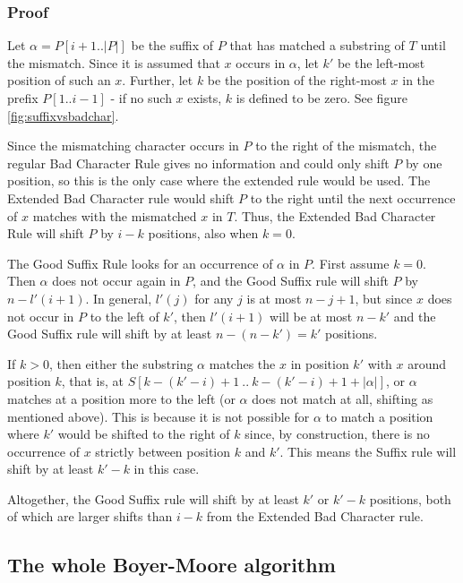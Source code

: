 \subsubsection{Proof}

Let $\alpha=P[i+1..|P|]$ be the suffix of $P$ that has matched a substring of $T$ until the mismatch. Since it is assumed that $x$ occurs in $\alpha$, let $k'$ be the left-most position of such an $x$. Further, let $k$ be the position of the right-most $x$ in the prefix $P[1..i-1]$ - if no such $x$ exists, $k$ is defined to be zero. See figure \ref{fig:suffixvsbadchar}. 

Since the mismatching character occurs in $P$ to the right of the mismatch, the regular Bad Character Rule gives no information and could only shift $P$ by one position, so this is the only case where the extended rule would be used. The Extended Bad Character rule would shift $P$ to the right until the next occurrence of $x$ matches with the mismatched $x$ in $T$. Thus, the Extended Bad Character Rule will shift $P$ by $i-k$ positions, also when $k=0$. 

The Good Suffix Rule looks for an occurrence of $\alpha$ in $P$. First assume $k=0$. Then $\alpha$ does not occur again in $P$, and the Good Suffix rule will shift $P$ by $n-l'(i+1)$. In general, $l'(j)$ for any $j$ is at most $n-j+1$, but since $x$ does not occur in $P$ to the left of $k'$, then $l'(i+1)$ will be at most $n-k'$ and the Good Suffix rule will shift by at least $n-(n-k') = k'$ positions. 

If $k>0$, then either the substring $\alpha$ matches the $x$ in position $k'$ with $x$ around position $k$, that is, at $S[k-(k'-i)+1\ ..\ k-(k'-i)+1+|\alpha|]$, or $\alpha$ matches at a position more to the left (or $\alpha$ does not match at all, shifting as mentioned above). This is because it is not possible for $\alpha$ to match a position where $k'$ would be shifted to the right of $k$ since, by construction, there is no occurrence of $x$ strictly between position $k$ and $k'$. This means the Suffix rule will shift by at least $k'-k$ in this case. 

Altogether, the Good Suffix rule will shift by at least $k'$ or $k'-k$ positions, both of which are larger shifts than $i-k$ from the Extended Bad Character rule. 

\rightline{$\square$}

\subsection{The whole Boyer-Moore algorithm}

